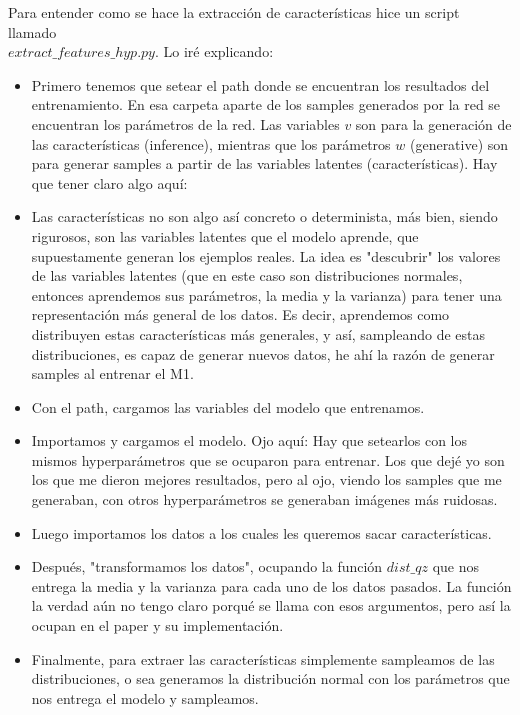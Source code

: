 \documentclass[letterpaper,11pt]{article} %
\begin{document}
	Para entender como se hace la extracción de características hice un script llamado\\ $extract\_features\_hyp.py$. Lo iré explicando:
	\begin{itemize}
		
	
	\item  Primero tenemos que setear el path donde se encuentran los resultados del entrenamiento. En esa carpeta aparte de los samples generados por la red se encuentran los parámetros de la red. Las variables $v$ son para la generación de las características (inference), mientras que los parámetros $w$ (generative) son para generar samples a partir de las variables latentes (características). Hay que tener claro algo aquí:
	\item Las características no son algo así concreto o determinista, más bien, siendo rigurosos, son las variables latentes que el modelo aprende, que supuestamente generan los ejemplos reales. La idea es "descubrir"  los valores de las variables latentes (que en este caso son distribuciones normales, entonces aprendemos sus parámetros, la media y la varianza) para tener una representación más general de los datos. Es decir, aprendemos como distribuyen estas características más generales, y así, sampleando de estas distribuciones, es capaz de generar nuevos datos, he ahí la razón de generar samples al entrenar el M1.
	\item Con el path, cargamos las variables del modelo que entrenamos.
	\item Importamos y cargamos el modelo. Ojo aquí: Hay que setearlos con los mismos hyperparámetros que se ocuparon para entrenar. Los que dejé yo son los que me dieron mejores resultados, pero al ojo, viendo los samples que me generaban, con otros hyperparámetros se generaban imágenes más ruidosas.
	\item Luego importamos los datos a los cuales les queremos sacar características.
	\item Después, "transformamos los datos", ocupando la función $dist\_qz$ que nos entrega la media y la varianza para cada uno de los datos pasados. La función la verdad aún no tengo claro porqué se llama con esos argumentos, pero así la ocupan en el paper y su implementación.
	\item Finalmente, para extraer las características simplemente sampleamos de las distribuciones, o sea generamos la distribución normal con los parámetros que nos entrega el modelo y sampleamos.
	
	\end{itemize}
	
\end{document}
